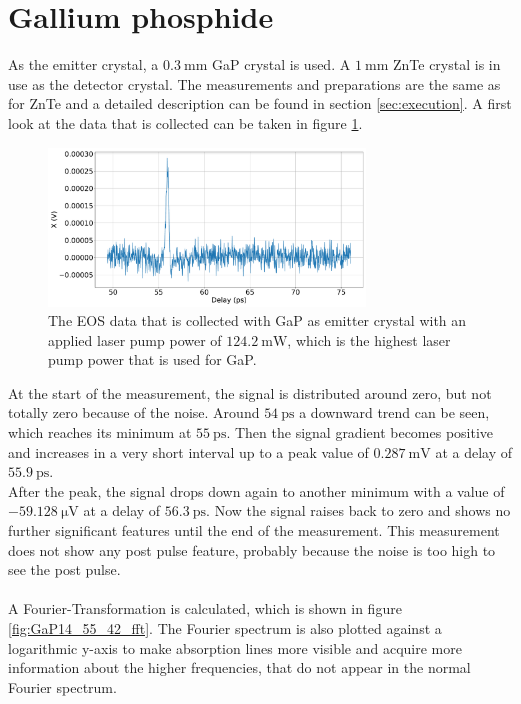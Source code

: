 \section{Gallium phosphide}
As the emitter crystal, a $\SI{0.3}{\milli\meter}$ GaP crystal is used.
A $\SI{1}{\milli\meter}$ ZnTe crystal is in use as the detector crystal.
The measurements and preparations are the same as for ZnTe and a detailed description can be found in section \ref{sec:execution}.
A first look at the data that is collected can be taken in figure \ref{fig:GaP14_55_42normalX}.
\\
\begin{figure}
    \centering
    \includegraphics[width=0.75\textwidth]{Plots/GaP14_55_42normalX.pdf}
    \caption{The EOS data that is collected with GaP as emitter crystal with an applied laser pump power of $\SI{124.2}{\milli\W}$, which is the highest laser pump power that is used for GaP.}
    \label{fig:GaP14_55_42normalX}
\end{figure}
At the start of the measurement, the signal is distributed around zero, but not totally zero because of the noise.
Around $\SI{54}{\pico\second}$ a downward trend can be seen, which reaches its minimum at $\SI{55}{\pico\second}$.
Then the signal gradient becomes positive and increases in a very short interval up to a peak value of $\SI{0.287}{\milli\V}$ at a delay of $\SI{55.9}{\pico\second}$.
\\
After the peak, the signal drops down again to another minimum with a value of $\SI{-59.128}{\micro\V}$ at a delay of $\SI{56.3}{\pico\second}$.
Now the signal raises back to zero and shows no further significant features until the end of the measurement.
This measurement does not show any post pulse feature, probably because the noise is too high to see the post pulse.
\\\\
A Fourier-Transformation is calculated, which is shown in figure \ref{fig:GaP14_55_42_fft}.
The Fourier spectrum is also plotted against a logarithmic y-axis to make absorption lines more visible and acquire more information about the higher frequencies, that do not appear in the normal Fourier spectrum.
